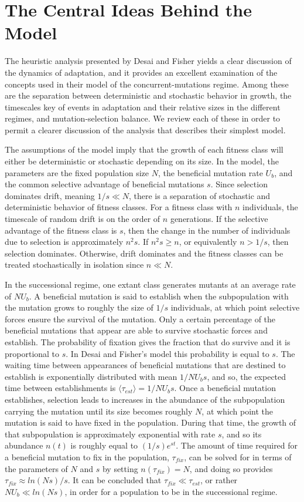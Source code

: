 \documentclass[12pt, one column]{article}
\begin{document}
\section*{The Central Ideas Behind the Model}
The heuristic analysis presented by Desai and Fisher yields a clear discussion of the dynamics of adaptation, and it provides an excellent examination of the concepts used in their model of the concurrent-mutations regime.  Among these are the separation between deterministic and stochastic behavior in growth, the timescales key of events in adaptation and their relative sizes in the different regimes, and mutation-selection balance.  We review each of these in order to permit a clearer discussion of the analysis that describes their simplest model.     

The assumptions of the model imply that the growth of each fitness class will either be deterministic or stochastic depending on its size.  In the model, the parameters are the fixed population size $N$, the beneficial mutation rate $U_b$, and the common selective advantage of beneficial mutations $s$.  Since selection dominates drift, meaning $1/s \ll N$, there is a separation of stochastic and deterministic behavior of fitness classes.  For a fitness class with $n$ individuals, the timescale of random drift is on the order of $n$ generations.  If the selective advantage of the fitness class is $s$, then the change in the number of individuals due to selection is approximately $n^2s$.  If $n^2s \ge n$, or equivalently $n>1/s$, then selection dominates.  Otherwise, drift dominates and the fitness classes can be treated stochastically in isolation since $n \ll N$.  

In the successional regime, one extant class generates mutants at an average rate of $N U_b$.  A beneficial mutation is said to establish when the subpopulation with the mutation grows to roughly the size of $1/s$ individuals, at which point selective forces ensure the survival of the mutation.  Only a certain percentage of the beneficial mutations that appear are able to survive stochastic forces and establish.  The probability of fixation gives the fraction that do survive and it is proportional to $s$.  In Desai and Fisher's model this probability is equal to $s$.  The waiting time between appearances of beneficial mutations that are destined to establish is exponentially distributed with mean $1/NU_b s$, and so, the expected time between establishments is $\langle \tau_{est} \rangle = 1/NU_b s$.  Once a beneficial mutation establishes, selection leads to increases in the abundance of the subpopulation carrying the mutation until its size becomes roughly $N$, at which point the mutation is said to have fixed in the population.  During that time, the growth of that subpopulation is approximately exponential with rate $s$, and so its abundance $n(t)$ is roughly equal to $(1/s) e^{st}$.  The amount of time required for a beneficial mutation to fix in the population, $\tau_{fix}$, can be solved for in terms of the parameters of $N$ and $s$ by setting $n(\tau_{fix})=N$, and doing so provides $\tau_{fix} \approx ln(Ns)/s$.  It can be concluded that $\tau_{fix} \ll \tau_{est}$, or rather $N U_b \ll ln(Ns)$, in order for a population to be in the successional regime. 
\end{document}

